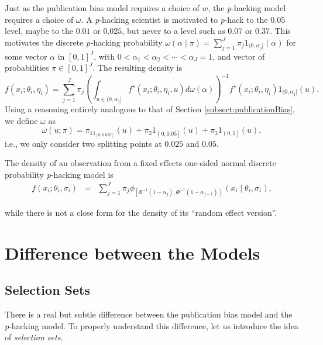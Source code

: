 \documentclass[preprint, authoryear]{elsarticle}
\theoremstyle{plain}
\theoremstyle{definition}
\begin{document}
Just as the publication bias model requires a choice of $w$, the \emph{p}-hacking model requires a choice of $\omega$. A \emph{p}-hacking scientist is motivated to \emph{p}-hack to the $0.05$ level, maybe to the $0.01$ or $0.025$, but never to a level such as $0.07$ or $0.37$. This motivates the discrete \emph{p-}hacking\emph{ }probability
$\omega\left(\alpha\mid\pi\right)=\sum_{j=1}^{J}\pi_{j}1_{(0,\alpha_{j}]}\left(\alpha\right)$
for some vector $\alpha$ in $\left[0,1\right]^{J}$, with $0<\alpha_{1}<\alpha_{2}<\cdots<\alpha_{J}=1$,
and vector of probabilities $\pi\in\left[0,1\right]^{J}$. The resulting density is 
\[
f\left(x_{i};\theta_{i},\eta_{i}\right)=\sum_{j=1}^{J}\pi_{j}\left(\int_{u\in(0,\alpha_{j}]}f^\star\left(x_{i};\theta_{i},\eta_{i}, u\right)d\omega(\alpha)\right)^{-1}f^\star\left(x_{i};\theta_{i},\eta_{i}\right)1_{(0,\alpha_{j}]}\left(u\right).
\]
Using a reasoning entirely analogous to that of Section \ref{subsect:publicationBias}, we define $\omega$ as
\[
\omega\left(u;\pi\right) = \pi_11_{\left[0,0.025\right]}\left(u\right) + \pi_{2}1_{\left(0,0.05\right]}\left(u\right) + \pi_{3}1_{\left(0,1\right]}\left(u\right),
\]
i.e., we only consider two splitting points at $0.025$ and $0.05$.

The density of an observation from a fixed effects one-sided normal discrete probability \emph{p}-hacking model is
\begin{eqnarray}
f\left(x_{i};\theta_{i},\sigma_{i}\right) & = & \sum_{j=1}^{J}\pi_{j}\phi_{\left[\Phi^{-1}\left(1-\alpha_{j}\right),\Phi^{-1}\left(1-\alpha_{j-1}\right)\right)}\left(x_{i}\mid\theta_{i},\sigma_{i}\right),\label{eq:Fixed effects, p-hacking}
\end{eqnarray}

while there is not a close form for the density of its ``random effect version''.

\section{Difference between the Models}\label{sect:differences}

\subsection{Selection Sets\label{sec:Selection Sets}}
There is a real but subtle difference between the publication bias model and the \emph{p}-hacking model. To properly understand this difference, let us introduce the idea of \emph{selection sets.}
\end{document}
